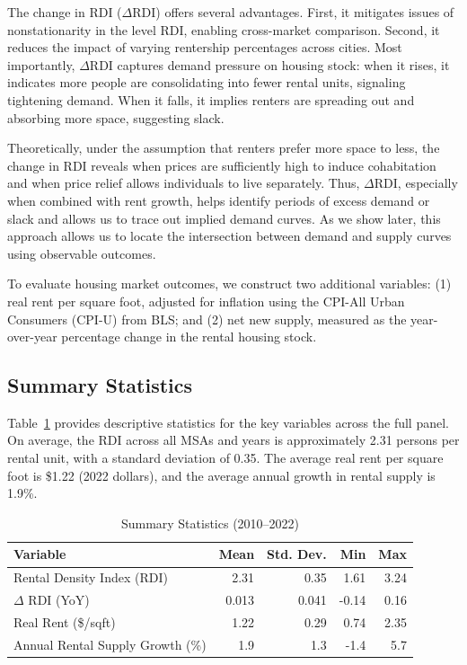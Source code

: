\documentclass[sn-mathphys-num]{sn-jnl}%
\begin{document}
The change in RDI (\( \Delta \text{RDI} \)) offers several advantages. First, it mitigates issues of nonstationarity in the level RDI, enabling cross-market comparison. Second, it reduces the impact of varying rentership percentages across cities. Most importantly, \( \Delta \text{RDI} \) captures demand pressure on housing stock: when it rises, it indicates more people are consolidating into fewer rental units, signaling tightening demand. When it falls, it implies renters are spreading out and absorbing more space, suggesting slack.

Theoretically, under the assumption that renters prefer more space to less, the change in RDI reveals when prices are sufficiently high to induce cohabitation and when price relief allows individuals to live separately. Thus, \( \Delta \text{RDI} \), especially when combined with rent growth, helps identify periods of excess demand or slack and allows us to trace out implied demand curves. As we show later, this approach allows us to locate the intersection between demand and supply curves using observable outcomes.

To evaluate housing market outcomes, we construct two additional variables: (1) real rent per square foot, adjusted for inflation using the CPI-All Urban Consumers (CPI-U) from BLS; and (2) net new supply, measured as the year-over-year percentage change in the rental housing stock.

\subsection*{Summary Statistics}

Table~\ref{tab:summary_stats} provides descriptive statistics for the key variables across the full panel. On average, the RDI across all MSAs and years is approximately 2.31 persons per rental unit, with a standard deviation of 0.35. The average real rent per square foot is \$1.22 (2022 dollars), and the average annual growth in rental supply is 1.9\%.

\begin{table}[H]
	\centering
	\caption*{Summary Statistics (2010--2022)}
	\label{tab:summary_stats}
	\begin{tabular}{lrrrr}
		\toprule
		Variable & Mean & Std. Dev. & Min & Max \\
		\midrule
		Rental Density Index (RDI) & 2.31 & 0.35 & 1.61 & 3.24 \\
		\(\Delta\) RDI (YoY) & 0.013 & 0.041 & -0.14 & 0.16 \\
		Real Rent (\$/sqft) & 1.22 & 0.29 & 0.74 & 2.35 \\
		Annual Rental Supply Growth (\%) & 1.9 & 1.3 & -1.4 & 5.7 \\
		\bottomrule
	\end{tabular}
\end{table}
\end{document}

